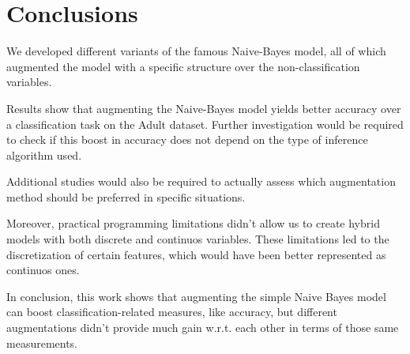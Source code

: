 \documentclass[twoside,twocolumn]{article}
\begin{document}
\section{Conclusions}

We developed different variants of the famous Naive-Bayes model, all of which augmented the model with a specific structure over the non-classification variables.

Results show that augmenting the Naive-Bayes model yields better accuracy over a classification task on the Adult dataset. 
Further investigation would be required to check if this boost in accuracy does not depend on the type of inference algorithm used.

Additional studies would also be required to actually assess which augmentation method should be preferred in specific situations. 

Moreover, practical programming limitations didn't allow us to create hybrid models with both discrete and continuos variables. 
These limitations led to the discretization of certain features, which would have been better represented as continuos ones.

In conclusion, this work shows that augmenting the simple Naive Bayes model can boost classification-related measures, like accuracy, 
but different augmentations didn't provide much gain w.r.t. each other in terms of those same measurements. 

\end{document}
